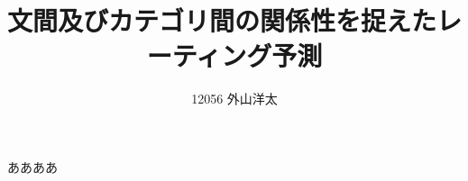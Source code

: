 \documentclass{ttisummary}
\title{文間及びカテゴリ間の関係性を捉えたレーティング予測}
\author{12056 外山洋太}
\date{}
\begin{document}
\layout
ああああ
\end{document}
